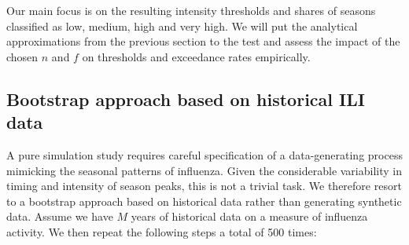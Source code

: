 \documentclass{article}
\begin{document}
Our main focus is on the resulting intensity thresholds and shares of seasons classified as low, medium, high and very high. We will put the analytical approximations from the previous section to the test and assess the impact of the chosen $n$ and $f$ on thresholds and exceedance rates empirically. %

\subsection{Bootstrap approach based on historical ILI data}

A pure simulation study requires careful specification of a data-generating process mimicking the seasonal patterns of influenza. Given the considerable variability in timing and intensity of season peaks, this is not a trivial task. We therefore resort to a bootstrap approach based on historical data rather than generating synthetic data. Assume we have $M$ years of historical data on a measure of influenza activity. We then repeat the following steps a total of 500 times:
\end{document}
